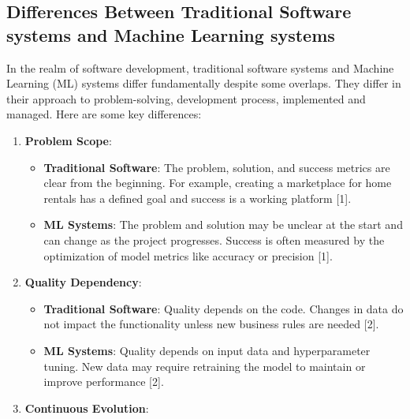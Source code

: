 \documentclass[
  letterpaper,
  DIV=11,
  numbers=noendperiod]{scrartcl}
\providecommand{\tightlist}{%
  \setlength{\itemsep}{0pt}\setlength{\parskip}{0pt}}\usepackage{longtable,booktabs,array}
\begin{document}
\subsection{Differences Between Traditional Software systems and Machine
Learning
systems}\label{differences-between-traditional-software-systems-and-machine-learning-systems}

In the realm of software development, traditional software systems and
Machine Learning (ML) systems differ fundamentally despite some
overlaps. They differ in their approach to problem-solving, development
process, implemented and managed. Here are some key differences:

\begin{enumerate}
\def\labelenumi{\arabic{enumi}.}
\tightlist
\item
  \textbf{Problem Scope}:

  \begin{itemize}
  \tightlist
  \item
    \textbf{Traditional Software}: The problem, solution, and success
    metrics are clear from the beginning. For example, creating a
    marketplace for home rentals has a defined goal and success is a
    working platform {[}1{]}.
  \item
    \textbf{ML Systems}: The problem and solution may be unclear at the
    start and can change as the project progresses. Success is often
    measured by the optimization of model metrics like accuracy or
    precision {[}1{]}.
  \end{itemize}
\item
  \textbf{Quality Dependency}:

  \begin{itemize}
  \tightlist
  \item
    \textbf{Traditional Software}: Quality depends on the code. Changes
    in data do not impact the functionality unless new business rules
    are needed {[}2{]}.
  \item
    \textbf{ML Systems}: Quality depends on input data and
    hyperparameter tuning. New data may require retraining the model to
    maintain or improve performance {[}2{]}.
  \end{itemize}
\item
  \textbf{Continuous Evolution}:


\end{enumerate}
\end{document}
